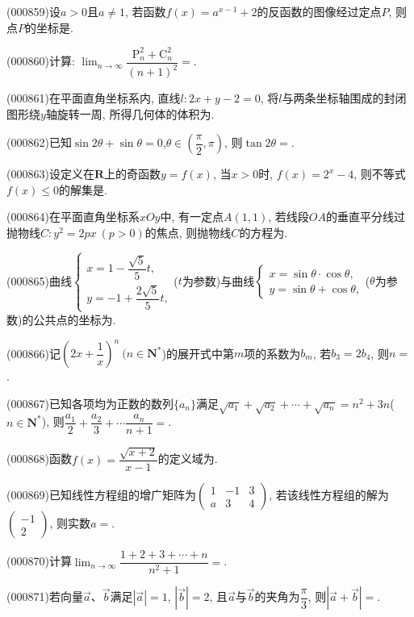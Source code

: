 \item (000859)设$a>0$且$a\ne 1$, 若函数$f(x)=a^{x-1}+2$的反函数的图像经过定点$P$, 则点$P$的坐标是.
\item (000860)计算: $\displaystyle\lim_{n\to\infty}\dfrac{\mathrm{P}_n^2+\mathrm{C}_n^2}{(n+1)^2}=$.
\item (000861)在平面直角坐标系内, 直线$l:2x+y-2=0$, 将$l$与两条坐标轴围成的封闭图形绕$y$轴旋转一周, 所得几何体的体积为.
\item (000862)已知$\sin 2\theta +\sin\theta =0$,$\theta \in (\dfrac{\pi}2,\pi)$, 则$\tan 2\theta =$.
\item (000863)设定义在$\mathbf{R}$上的奇函数$y=f(x)$, 当$x>0$时, $f(x)=2^x-4$, 则不等式$f(x)\le 0$的解集是.
\item (000864)在平面直角坐标系$xOy$中, 有一定点$A(1,1)$, 若线段$OA$的垂直平分线过抛物线$C:y^2=2px \ (p>0)$的焦点, 则抛物线$C$的方程为.
\item (000865)曲线$\begin{cases} x=1-\dfrac{\sqrt5}5 t, \\ y=-1+\dfrac{2\sqrt5}5t, \end{cases}$($t$为参数)与曲线$\begin{cases} x=\sin \theta \cdot \cos \theta, \\ y=\sin \theta +\cos \theta,  \end{cases}$($\theta$为参数)的公共点的坐标为.
\item (000866)记$(2x+\dfrac1x)^n \ (n\in \mathbf{N}^*$)的展开式中第$m$项的系数为$b_m$, 若$b_3=2b_4$, 则$n=$.
\item (000867)已知各项均为正数的数列$\{a_n\}$满足$\sqrt{a_1}+\sqrt{a_2}+\cdots+\sqrt{a_n}=n^2+3n$($n\in \mathbf{N}^*$), 则$\dfrac{a_1}2+\dfrac{a_2}3+\cdots \dfrac{a_n}{n+1}=$.
\item (000868)函数$f(x)=\dfrac{\sqrt{x+2}}{x-1}$的定义域为.
\item (000869)已知线性方程组的增广矩阵为$\begin{pmatrix} 1 & -1  & 3  \\ a & 3 & 4 \end{pmatrix}$, 若该线性方程组的解为$\begin{pmatrix} -1 \\ 2\end{pmatrix}$, 则实数$a=$.
\item (000870)计算$\displaystyle\lim_{n\to\infty}\dfrac{1+2+3+\cdots +n}{n^2+1}=$.
\item (000871)若向量$\overrightarrow a$、$\overrightarrow b$满足$|\overrightarrow a|=1$, $|\overrightarrow b|=2$, 且$\overrightarrow a$与$\overrightarrow b$的夹角为$\dfrac{\pi}3$, 则$|\overrightarrow a+\overrightarrow b|=$.
